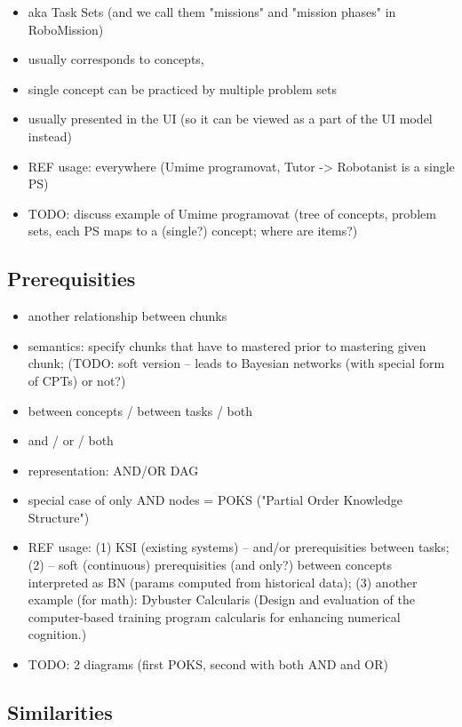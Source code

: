 \begin{itemize}
\item aka Task Sets (and we call them "missions" and "mission phases" in RoboMission)
\item usually corresponds to concepts,
\item single concept can be practiced by multiple problem sets
\item usually presented in the UI (so it can be viewed as a part of the UI model instead)
\item REF usage: everywhere (Umime programovat, Tutor -> Robotanist is a single PS)
\item TODO: discuss example of Umime programovat (tree of concepts, problem
  sets, each PS maps to a (single?) concept; where are items?)
\end{itemize}


\subsection{Prerequisities}

\begin{itemize}
\item another relationship between chunks
\item semantics: specify chunks that have to mastered prior to mastering given chunk;
  (TODO: soft version -- leads to Bayesian networks (with special form of CPTs) or not?)
\item between concepts / between tasks / both
\item and / or / both
\item representation: AND/OR DAG
\item special case of only AND nodes = POKS ("Partial Order Knowledge Structure")
\item REF usage:
  (1) KSI (existing systems) -- and/or prerequisities between tasks;
  (2) \cite{its-programming} -- soft (continuous) prerequisities (and only?)
    between concepts interpreted as BN (params computed from historical data);
  (3) another example (for math): Dybuster Calcularis (Design and evaluation of the computer-based training program calcularis for enhancing numerical cognition.)
\item TODO: 2 diagrams (first POKS, second with both AND and OR)
\end{itemize}


\subsection{Similarities}

